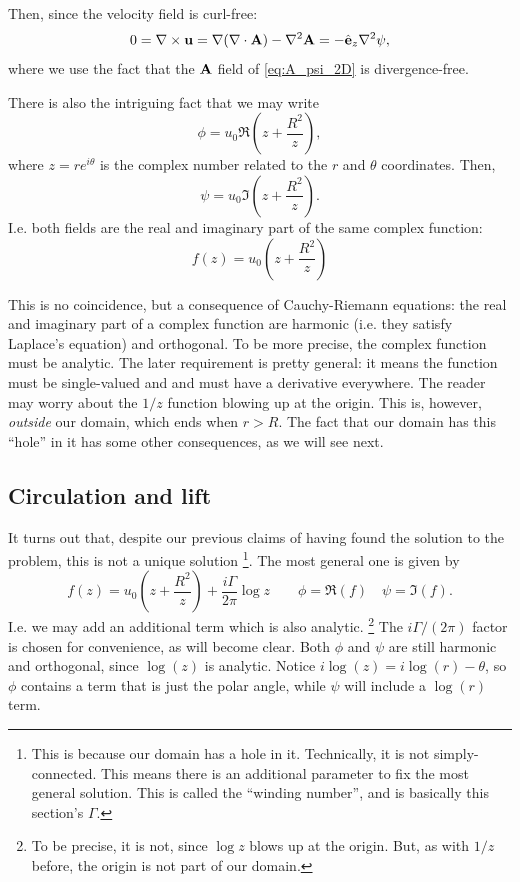 Then, since the velocity field is curl-free:
\begin{equation}
  \label{eq:if_no_curl_then_stream_harmonic}
  0 = \nabla \times \mathbf{u} =
  \nabla (\nabla \cdot \mathbf {A} )- \nabla^{2}\mathbf {A} =
  - \hat{\mathbf{e}}_z \nabla^{2} \psi,
\end{equation}
where we use the fact that the $\mathbf{A}$ field of \ref{eq:A_psi_2D} is
divergence-free.


There is also the intriguing fact that we may write
\[
\phi = u_0 \Re \left( z  + \frac{R^2}{z} \right) ,
\]
where $z=r e^{i\theta}$ is the complex number related to the $r$ and
$\theta$ coordinates. Then,
\[
\psi = u_0 \Im \left( z  + \frac{R^2}{z} \right) .
\]
%
I.e. both fields are the real and imaginary part of the same complex
function:
\[
f(z) = u_0 \left( z  + \frac{R^2}{z} \right)
\]

This is no coincidence, but a consequence of Cauchy-Riemann
equations: the real and imaginary part of a complex function are
harmonic (i.e. they satisfy Laplace's equation) and orthogonal. To be
more precise, the complex function must be analytic. The later
requirement is pretty general: it means the function must be
single-valued and and must have a derivative everywhere. The reader
may worry about the $1/z$ function blowing up at the origin. This is, however,
\emph{outside} our domain, which ends when $r>R$. The fact that our
domain has this ``hole'' in it has some other consequences, as we will see
next.


\subsection{Circulation and lift}

It turns out that, despite our previous claims of having found the
solution to the problem, this is not a unique solution%
\footnote{This is because our domain has a hole in it. Technically, it
  is not simply-connected. This means there is an additional parameter
  to fix the most general solution. This is called the ``winding
  number'', and is basically this section's $\Gamma$.}.
%
The most general one is given by
\[
 f(z) = u_0 \left( z + \frac{R^2}{z} \right)
 + \frac{i \Gamma}{2\pi} \log z \qquad
 \phi=\Re(f) \quad
 \psi=\Im(f) .
\]
I.e. we may add an additional term which is also analytic.%
\footnote{To be precise, it is not, since $\log z$ blows up at
the origin. But, as with $1/z$ before, the origin is not part of
our domain.}
The $i \Gamma/(2\pi)$ factor is chosen for convenience, as will become
clear. Both $\phi$ and $\psi$ are still harmonic and orthogonal, since
$\log(z)$ is analytic. Notice $i \log(z)= i \log(r) - \theta$, so
$\phi$ contains a term that is just the polar angle, while $\psi$ will
include a $\log(r)$ term.

